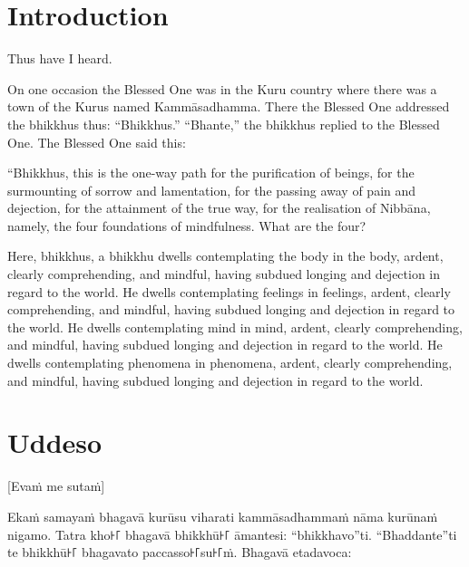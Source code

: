 \newcommand\englishPage{%
  \clearpage%
  \englishText%
}

\newcommand\paliPage{%
  \clearpage%
  \paliText%
}

\renewcommand{\englishTitle}{The Foundations of Mindfulness}
\renewcommand{\paliTitle}{Mahāsatipaṭṭhāna Sutta}

\englishPage
\chapter{Introduction}

Thus have I heard.

On one occasion the Blessed One was in the Kuru country where there was a town
of the Kurus named Kammāsadhamma. There the Blessed One addressed the bhikkhus
thus: “Bhikkhus.” “Bhante,” the bhikkhus replied to the Blessed One. The Blessed
One said this:

“Bhikkhus, this is the one-way path for the purification of beings, for the
surmounting of sorrow and lamentation, for the passing away of pain and
dejection, for the attainment of the true way, for the realisation of Nibbāna,
namely, the four foundations of mindfulness. What are the four?

Here, bhikkhus, a bhikkhu dwells contemplating the body in the body, ardent,
clearly comprehending, and mindful, having subdued longing and dejection in
regard to the world. He dwells contemplating feelings in feelings, ardent,
clearly comprehending, and mindful, having subdued longing and dejection in
regard to the world. He dwells contemplating mind in mind, ardent, clearly
comprehending, and mindful, having subdued longing and dejection in regard to
the world. He dwells contemplating phenomena in phenomena, ardent, clearly
comprehending, and mindful, having subdued longing and dejection in regard to
the world.


\paliPage
\chapter*{Uddeso}

[Evaṁ me sutaṁ]

Ekaṁ samayaṁ bhagavā kurūsu viharati kammāsadhammaṁ nāma kurūnaṁ nigamo. Tatra
kho꜔꜒ bhagavā bhikkhū꜔꜒ āmantesi: “bhikkhavo”ti. “Bhaddante”ti te bhikkhū꜔꜒ bhagavato
paccasso꜔꜒su꜔꜒ṁ. Bhagavā etadavoca:

